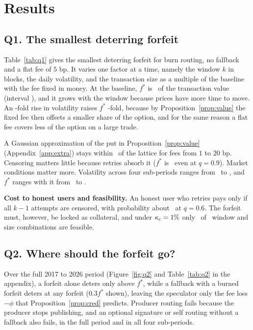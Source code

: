 \documentclass[11pt]{article}
\begin{document}
\section{Results}\label{sec:results}
\subsection{Q1. The smallest deterring forfeit}
Table~\ref{tab:q1} gives the smallest deterring forfeit for burn routing, no fallback and a flat fee of $5$ bp. It varies one factor at a time, namely the window $k$ in blocks, the daily volatility, and the transaction size as a multiple of the baseline with the fee fixed in money. At the baseline, $f^*$ is \FstarKHundred\ of the transaction value (interval \FstarCI), and it grows with the window because prices have more time to move. An \VolSweepFactor-fold rise in volatility raises $f^*$ \VolSweepRatio-fold, because by Proposition~\ref{prop:value} the fixed fee then offsets a smaller share of the option, and for the same reason a flat fee covers less of the option on a large trade.


A Gaussian approximation of the put in Proposition~\ref{prop:value} (Appendix~\ref{app:extra}) stays within \GaussMaxRelErr\ of the lattice for fees from $1$ to $20$ bp. Censoring matters little because retries absorb it ($f^*$ is \QfNine\ even at $q=0.9$). Market conditions matter more. Volatility across four sub-periods ranges from \VolLow\ to \VolHigh, and $f^*$ ranges with it from \FstarLow\ to \FstarHigh.

\textbf{Cost to honest users and feasibility.} An honest user who retries pays only if all $k-1$ attempts are censored, with probability about \HonestDropMax\ at $q=0.6$. The forfeit must, however, be locked as collateral, and under $\kappa_c=1\%$ only \NFeasible\ of \NCells\ window and size combinations are feasible.

\subsection{Q2. Where should the forfeit go?}
Over the full 2017 to 2026 period (Figure~\ref{fig:q2} and Table~\ref{tab:q2} in the appendix), a forfeit alone deters only above $f^*$, while a fallback with a burned forfeit deters at any forfeit ($0.3f^*$ shown), leaving the speculator only the fee loss $-\phi$ that Proposition~\ref{prop:cred} predicts. Producer routing fails because the producer stops publishing, and an optional signature or self routing without a fallback also fails, in the full period and in all four sub-periods.
\end{document}
